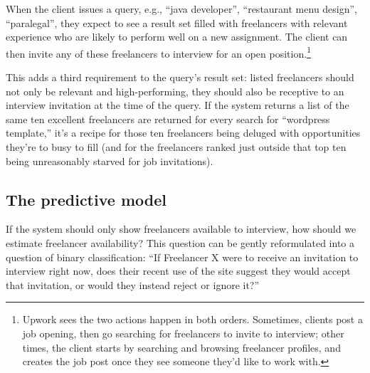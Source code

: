 \documentclass{article}
\begin{document}
When the client issues a query, e.g., ``java developer'', ``restaurant menu design'', ``paralegal'', they expect to see a result set filled with freelancers with relevant experience who are likely to perform well on a new assignment. The client can then invite any of these freelancers to interview for an open position.\footnote{Upwork sees the two actions happen in both orders. Sometimes, clients post a job opening, then go searching for freelancers to invite to interview; other times, the client starts by searching and browsing freelancer profiles, and creates the job post once they see someone they'd like to work with.}

This adds a third requirement to the query's result set: listed freelancers should not only be relevant and high-performing, they should also be receptive to an interview invitation at the time of the query. If the system returns a list of the same ten excellent freelancers are returned for every search for ``wordpress template,'' it's a recipe for those ten freelancers being deluged with opportunities they're to busy to fill (and for the freelancers ranked just outside that top ten being unreasonably starved for job invitations).

\subsection{The predictive model}

If the system should only show freelancers available to interview, how should we estimate freelancer availability? This question can be gently reformulated into a question of binary classification: ``If Freelancer X were to receive an invitation to interview right now, does their recent use of the site suggest they would accept that invitation, or would they instead reject or ignore it?''
\end{document}
